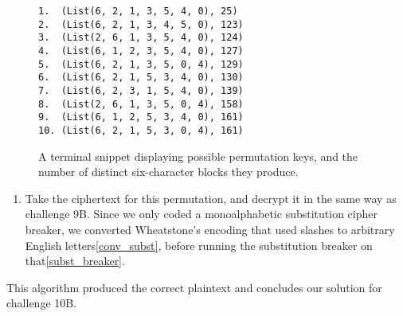 \begin{figure}[H]
\centering
\begin{minipage}{38ex}
    \begin{verbatim}
1.  (List(6, 2, 1, 3, 5, 4, 0), 25) 
2.  (List(6, 2, 1, 3, 4, 5, 0), 123)
3.  (List(2, 6, 1, 3, 5, 4, 0), 124)
4.  (List(6, 1, 2, 3, 5, 4, 0), 127)
5.  (List(6, 2, 1, 3, 5, 0, 4), 129)
6.  (List(6, 2, 1, 5, 3, 4, 0), 130)
7.  (List(6, 2, 3, 1, 5, 4, 0), 139)
8.  (List(2, 6, 1, 3, 5, 0, 4), 158)
9.  (List(6, 1, 2, 5, 3, 4, 0), 161)
10. (List(6, 2, 1, 5, 3, 0, 4), 161)
    \end{verbatim}
\end{minipage}
\caption{A terminal snippet displaying possible permutation keys, and the number of distinct six-character blocks they produce.}
\label{lst:terminalkeys}
\end{figure}

\begin{enumerate}[resume]
    \item Take the ciphertext for this permutation, and decrypt it in the same way as challenge 9B. Since we only coded a monoalphabetic substitution cipher breaker, we converted Wheatstone's encoding that used slashes to arbitrary English letters\cref{conv_subst}, before running the substitution breaker on that\cref{subst_breaker}.
\end{enumerate}

This algorithm produced the correct plaintext and concludes our solution for challenge 10B.